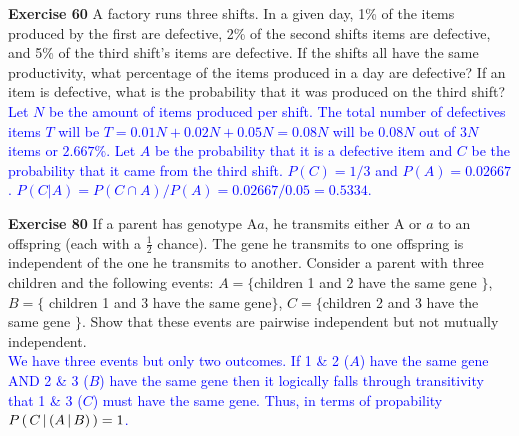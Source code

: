 \documentclass[10pt,a4paper]{report}
\newcommand{\BLUE}[1]{\textcolor{blue}{#1}}
\begin{document}
\noindent\textbf{Exercise 60} A factory runs three shifts.  In a given day, 1\% of the items produced by the first are defective, 2\% of the second shifts items are defective, and 5\% of the third shift's items are defective.  If the shifts all have the same productivity, what percentage of the items produced in a day are defective?  If an item is defective, what is the probability that it was produced on the third shift?\\

\BLUE{Let $N$ be the amount of items produced per shift.  The total number of defectives items $T$ will be $T = 0.01N+0.02N+0.05N = 0.08N$ will be $0.08N$ out of $3N$ items or $2.667\%$.  Let $A$ be the probability that it is a defective item and $C$ be the probability that it came from the third shift.  $P(C) = 1/3$ and $P(A) = 0.02667$.  $P(C|A) = P(C \cap A)/P(A) = 0.02667/0.05 = 0.5334$.\\
}

\noindent\textbf{Exercise 80}  If a parent has genotype A$a$, he transmits either A or $a$ to an offspring (each with a $\frac{1}{2}$ chance).  The gene he transmits to one offspring is independent of the one he transmits to another.  Consider a parent with three children and the following events:  $A = \{$children 1 and 2 have the same gene $\}$, $B=\{$ children 1 and 3 have the same gene$\}$, $C=\{$children 2 and 3 have the same gene $\}$.  Show that these events are pairwise independent but not mutually independent.\\

\BLUE{We have three events but only two outcomes.  If 1 \& 2 ($A$) have the same gene AND 2 \& 3 ($B$) have the same gene then it logically falls through transitivity that 1 \& 3 ($C$) must have the same gene.  Thus, in terms of propability $P\left (\, C\,|\,(A \,|\, B) \,\right ) = 1$.
}
\end{document}
